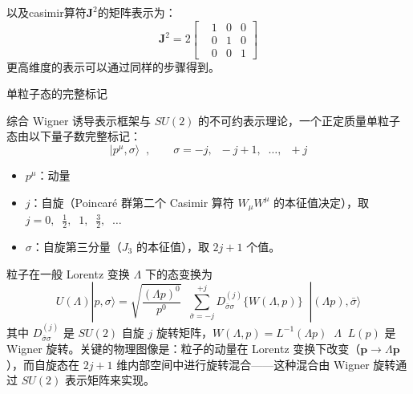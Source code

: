 以及casimir算符$\pmb{J}^2$的矩阵表示为：
\begin{equation}
    \pmb{J}^2=
    2
    \begin{bmatrix}
        & 1&0&0\\
        & 0&1&0\\
        & 0&0&1
    \end{bmatrix}
\end{equation}
更高维度的表示可以通过同样的步骤得到。
\begin{center}\vspace{2ex}
\large 单粒子态的完整标记
\vspace{2ex}\end{center}
综合 Wigner 诱导表示框架与 $SU(2)$ 的不可约表示理论，一个正定质量单粒子态由以下量子数完整标记：
\begin{equation}
|p^\mu,\sigma\rangle\;\;,\qquad \sigma = -j,\;\;-j+1,\;\;\ldots,\;\;+j
\end{equation}
\begin{itemize}
\item $p^\mu$：动量
\item $j$：自旋（Poincar\'{e} 群第二个 Casimir 算符 $W_\mu W^\mu$ 的本征值决定），取 $j = 0,\;\;\tfrac{1}{2},\;\;1,\;\;\tfrac{3}{2},\;\;\ldots$
\item $\sigma$：自旋第三分量（$J_3$ 的本征值），取 $2j+1$ 个值。
\end{itemize}

粒子在一般 Lorentz 变换 $\Lambda$ 下的态变换为
\begin{equation}
U(\Lambda)|p,\sigma\rangle
= \sqrt{\frac{(\Lambda p)^0}{p^0}}\;\;
\sum_{\bar{\sigma}=-j}^{+j} D^{(j)}_{\bar{\sigma}\sigma}\{W(\Lambda,p)\}\;\;
|(\Lambda p),\bar{\sigma}\rangle
\end{equation}
其中 $D^{(j)}_{\bar{\sigma}\sigma}$ 是 $SU(2)$ 自旋 $j$  旋转矩阵，$W(\Lambda,p) = L^{-1}(\Lambda p)\;\;\Lambda\;\;L(p)$ 是 Wigner 旋转。关键的物理图像是：粒子的动量在 Lorentz 变换下改变（$\mathbf{p}\to\Lambda\mathbf{p}$），而自旋态在 $2j+1$ 维内部空间中进行旋转混合——这种混合由 Wigner 旋转通过 $SU(2)$ 表示矩阵来实现。
\newpage
